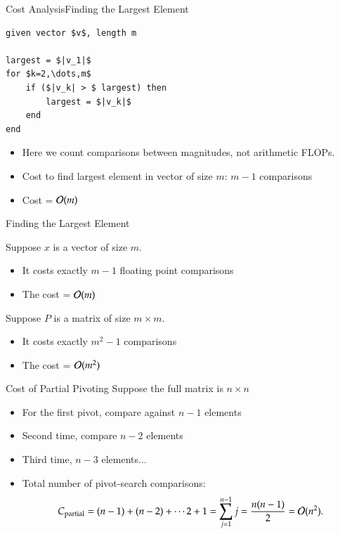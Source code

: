 \documentclass[10pt]{beamer}
\begin{document}
\begin{frame}[fragile]{Cost Analysis}{Finding the Largest Element}
\begin{lstlisting}[mathescape,caption=max function,label=algo:max]
given vector $v$, length m

largest = $|v_1|$
for $k=2,\dots,m$ 
    if ($|v_k| > $ largest) then 
        largest = $|v_k|$
    end
end                          
\end{lstlisting}
\begin{itemize}
    \item Here we count comparisons between magnitudes, not arithmetic FLOPs.
    \item Cost to find largest element in vector of size $m$: $m-1$ comparisons
    \item Cost =  ${\mathcal{O}}(m)$
\end{itemize}

\end{frame}


\begin{frame}[fragile]{Finding the Largest Element}

Suppose $x$ is a vector of size $m$. 
\begin{itemize}
    \item It costs exactly $m-1$ floating point comparisons
    \item The cost = ${\mathcal{O}}(m)$
\end{itemize}

\bigskip
Suppose $P$ is a matrix of size $m\times m$. 
\begin{itemize}
    \item It costs exactly $m^2-1$ comparisons 
    \item The cost = ${\mathcal{O}}(m^2)$
\end{itemize}

\bigskip 
{}
\end{frame}


\begin{frame}{Cost of Partial Pivoting}
Suppose the full matrix is $n \times n$ 
\begin{itemize}
    \item For the first pivot, compare against $n-1$ elements
    \item Second time, compare $n-2$ elements
    \item Third time, $n-3$ elements... 
    \item Total number of pivot-search comparisons:
\[
    C_{\mathrm{partial}}
    = (n-1)+(n-2)  + \cdots 2+1=
    \sum_{j=1}^{n-1}j
    =
    \frac{n(n-1)}{2}
    =
    {\mathcal{O}}(n^2).
\]


\end{itemize}

\begin{center}
\end{center}
    
\end{frame}
\end{document}
